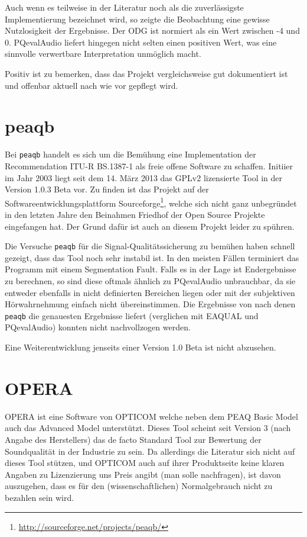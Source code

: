 Auch wenn es teilweise in der Literatur noch als die zuverlässigste Implementierung bezeichnet wird\cite{nishimura2013objective}, so zeigte die Beobachtung eine gewisse Nutzlosigkeit der Ergebnisse. Der ODG ist normiert als ein Wert zwischen -4 und 0. PQevalAudio liefert hingegen nicht selten einen positiven Wert, was eine sinnvolle verwertbare Interpretation unmöglich macht.

Positiv ist zu bemerken, dass das Projekt vergleichsweise gut dokumentiert ist und offenbar aktuell nach wie vor gepflegt wird.

\section{peaqb}

Bei \texttt{peaqb} handelt es sich um die Bemühung eine Implementation der Recommendation ITU-R BS.1387-1 als freie offene Software zu schaffen. Initiier im Jahr 2003 liegt seit dem 14. März 2013 das GPLv2 lizensierte Tool in der Version 1.0.3 Beta vor. Zu finden ist das Projekt auf der Softwareentwicklungsplattform Sourceforge\footnote{\url{http://sourceforge.net/projects/peaqb/}}, welche sich nicht ganz unbegr\"undet in den letzten Jahre den Beinahmen \glqq Friedhof der Open Source Projekte\grqq{} eingefangen hat. Der Grund daf\"ur ist auch an diesem Projekt leider zu sp\"uhren. 

Die Versuche \texttt{peaqb} für die Signal-Qualitätssicherung zu bem\"uhen haben schnell gezeigt, dass das Tool noch sehr instabil ist. In den meisten Fällen terminiert das Programm mit einem Segmentation Fault. Falls es in der Lage ist Endergebnisse zu berechnen, so sind diese oftmals ähnlich zu PQevalAudio unbrauchbar, da sie entweder ebenfalls in nicht definierten Bereichen liegen oder mit der subjektiven H\"orwahrnehmung einfach nicht \"ubereinstimmen. Die Ergebnisse von \cite{kondo2012use} nach denen \texttt{peaqb} die genauesten Ergebnisse liefert (verglichen mit EAQUAL und PQevalAudio) konnten nicht nachvollzogen werden.

Eine Weiterentwicklung jenseits einer Version 1.0 Beta ist nicht abzusehen. 

\section{OPERA}

OPERA ist eine Software von OPTICOM welche neben dem PEAQ Basic Model auch das Advanced Model unterstützt. Dieses Tool scheint seit Version 3 (nach Angabe des Herstellers) das de facto Standard Tool zur Bewertung der Soundqualität in der Industrie zu sein. Da allerdings die Literatur sich nicht auf dieses Tool stützen, und OPTICOM auch auf ihrer Produktseite keine klaren Angaben zu Lizenzierung uns Preis angibt (man solle nachfragen), ist davon auszugehen, dass es für den (wissenschaftlichen) \glqq{}Normalgebrauch\grqq{} nicht zu bezahlen sein wird.




